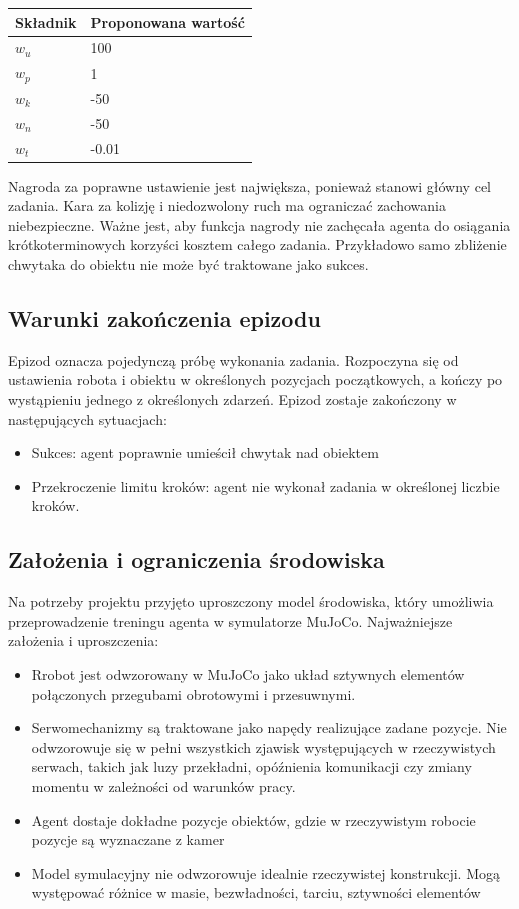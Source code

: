 \documentclass[12pt]{article}
\begin{document}
\begin{center}
\begin{tabular}{p{}p{}}
\toprule
Składnik & Proponowana wartość \\
\midrule
$w_u$ & 100\\
$w_p$ & 1 \\
$w_k$ & -50 \\
$w_n$ & -50\\
$w_t$ & -0.01\\
\bottomrule
\end{tabular}
\end{center}

Nagroda za poprawne ustawienie jest największa, ponieważ stanowi główny cel zadania.
Kara za kolizję i niedozwolony ruch ma ograniczać zachowania niebezpieczne.
Ważne jest, aby funkcja nagrody nie zachęcała agenta do osiągania krótkoterminowych korzyści kosztem całego zadania. 
Przykładowo samo zbliżenie chwytaka do obiektu nie może być traktowane jako sukces.


\subsection{Warunki zakończenia epizodu}

Epizod oznacza pojedynczą próbę wykonania zadania. Rozpoczyna się od ustawienia robota i obiektu w określonych pozycjach początkowych, a kończy po wystąpieniu jednego z określonych zdarzeń.
Epizod zostaje zakończony w następujących sytuacjach:
\begin{itemize}
    \item Sukces: agent poprawnie umieścił chwytak nad obiektem
    \item Przekroczenie limitu kroków: agent nie wykonał zadania w określonej liczbie kroków.
\end{itemize}

\subsection{Założenia i ograniczenia środowiska}

Na potrzeby projektu przyjęto uproszczony model środowiska, który umożliwia przeprowadzenie treningu agenta w symulatorze MuJoCo.
Najważniejsze założenia i uproszczenia:
\begin{itemize}
    \item Rrobot jest odwzorowany w MuJoCo jako układ sztywnych elementów połączonych przegubami obrotowymi i przesuwnymi.
    \item Serwomechanizmy są traktowane jako napędy realizujące zadane pozycje. Nie odwzorowuje się w pełni wszystkich zjawisk występujących w rzeczywistych serwach, takich jak luzy przekładni, opóźnienia komunikacji czy zmiany momentu w zależności od warunków pracy.
    \item Agent dostaje dokładne pozycje obiektów, gdzie w rzeczywistym robocie pozycje są wyznaczane z kamer
    \item Model symulacyjny nie odwzorowuje idealnie rzeczywistej konstrukcji. Mogą występować różnice w masie, bezwładności, tarciu, sztywności elementów
\end{itemize}
\end{document}
